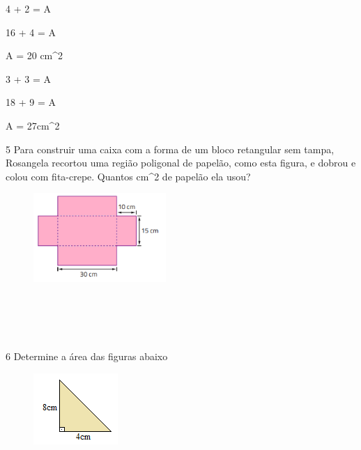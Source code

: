4  + 2  = A

16 + 4 = A

A = 20 cm^2
\item

3 + 3  = A

18 + 9 = A

A = 27cm^2

\num{5} Para construir uma caixa com a forma de um bloco retangular sem
tampa, Rosangela recortou uma região poligonal de papelão, como esta
figura, e dobrou e colou com fita-crepe. Quantos cm^2 de papelão ela
usou?

\begin{figure}[H]
\centering\includegraphics[width=1.98333in,height=1.33255in]{./imgSAEB_8_MAT/media/image45.png}
\end{figure}

\\
\\
\\
\\

\num{6} Determine a área das figuras abaixo
\item
\begin{figure}[H]
\centering\includegraphics[width=1.26042in,height=1.0625in]{./imgSAEB_8_MAT/media/image46.png}
\end{figure}

\\
\\
\\

